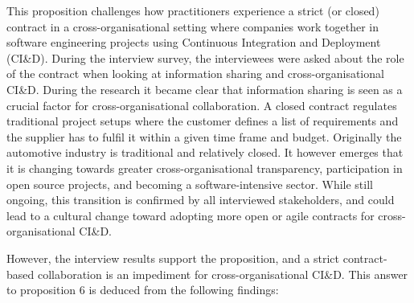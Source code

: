 This proposition challenges how practitioners experience a strict (or closed) contract in a cross-organisational setting where companies work together in software engineering projects using Continuous Integration and Deployment (CI\&D). During the interview survey, the interviewees were asked about the role of the contract when looking at information sharing and cross-organisational CI\&D. During the research it became clear that information sharing is seen as a crucial factor for cross-organisational collaboration. A closed contract regulates traditional project setups where the customer defines a list of requirements and the supplier has to fulfil it within a given time frame and budget. Originally the automotive industry is traditional and relatively closed. It however emerges that it is changing towards greater cross-organisational transparency, participation in open source projects, and becoming a software-intensive sector. While still ongoing, this transition is confirmed by all interviewed stakeholders, and could lead to a cultural change toward adopting more open or agile contracts for cross-organisational CI\&D.

However, the interview results support the proposition, and a strict contract-based collaboration is an impediment for cross-organisational CI\&D. This answer to proposition 6 is deduced from the following findings:


